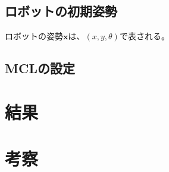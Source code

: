 \subsection{ロボットの初期姿勢}
ロボットの姿勢$\bm{x}$は、$(x, y, \theta)$で表される。

\subsection{MCLの設定}


\section{結果} \label{section:結果}


\section{考察} \label{section:考察}

